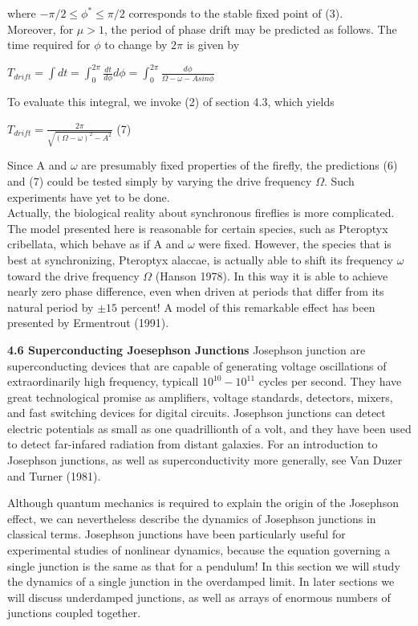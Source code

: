\documentclass{article}
\newcommand\tab[1][1cm]{\hspace*{#1}}
\begin{document}
where $-\pi/2 \leq \phi^{*} \leq \pi/2$ corresponds to the stable fixed point of (3). \\ \tab 
Moreover, for $\mu > 1$, the period of phase drift may be predicted as follows. The time required for $\phi$ to change by $2\pi$ is given by
\begin{center}
$T_{drift}=\int dt = \int_{0}^{2\pi} \frac{dt}{d\phi} d\phi = \int_{0}^{2\pi} \frac{d\phi}{\Omega-\omega-Asin{\phi}}$
\end{center}

To evaluate this integral, we invoke (2) of section 4.3, which yields 
\begin{center}
$T_{drift}=\frac{2\pi}{\sqrt{(\Omega-\omega)^{2}-A^{2}}}$ \tab (7)
\end{center}
Since A and $\omega$ are presumably fixed properties of the firefly, the predictions (6) and (7) could be tested simply by varying the drive frequency $\Omega$. Such experiments have yet to be done. \\ \tab
Actually, the biological reality about synchronous fireflies is more complicated. The model presented here is reasonable for certain species, such as Pteroptyx cribellata, which behave as if A and $\omega$ were fixed. However, the species that is best at synchronizing, Pteroptyx alaccae, is actually able to shift its frequency $\omega$ toward the drive frequency $\Omega$ (Hanson 1978). In this way it is able to achieve nearly zero phase difference, even when driven at periods that differ from its natural period by $\pm 15$ percent! A model of this remarkable effect has been presented by Ermentrout (1991). 

\textbf {4.6 Superconducting Joesephson Junctions}
Josephson junction are superconducting devices that are capable of generating voltage oscillations of extraordinarily high frequency, typicall $10^{10}-10^{11}$ cycles per second. They have great technological promise as amplifiers, voltage standards, detectors, mixers, and fast switching devices for digital circuits. Josephson junctions can detect electric potentials as small as one quadrillionth of a volt, and they have been used to detect far-infared radiation from distant galaxies. For an introduction to Josephson junctions, as well as superconductivity more generally, see Van Duzer and Turner (1981). \\ \tab

Although quantum mechanics is required to explain the origin of the Josephson effect, we can nevertheless describe the dynamics of Josephson junctions in classical terms. Josephson junctions have been particularly useful for experimental studies of nonlinear dynamics, because the equation governing a single junction is the same as that for a pendulum! In this section we will study the dynamics of a single junction in the overdamped limit. In later sections we will discuss underdamped junctions, as well as arrays of enormous numbers of junctions coupled together. 
\end{document}

